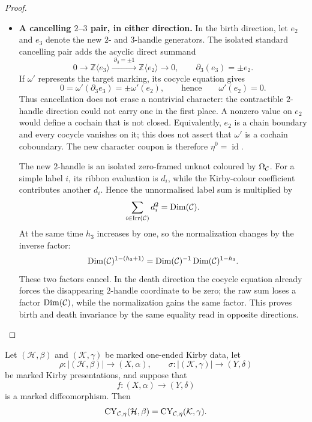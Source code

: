 \begin{proof}
\begin{itemize}
\begin{itemize}
  \item \textbf{A cancelling \(2\)--\(3\) pair, in either direction.}
  In the birth direction, let \(e_2\) and \(e_3\) denote the new
  \(2\)- and \(3\)-handle generators.  The isolated standard cancelling
  pair adds the acyclic direct summand
  \[
    0\longrightarrow \mathbb Z\langle e_3\rangle
      \xrightarrow{\;\partial_3=\pm1\;}
    \mathbb Z\langle e_2\rangle
      \longrightarrow0,
    \qquad
    \partial_3(e_3)=\pm e_2.
  \]
  If \(\omega'\) represents the target marking, its cocycle equation gives
  \[
    0=\omega'(\partial_3e_3)=\pm\omega'(e_2),
    \qquad\text{hence}\qquad
    \omega'(e_2)=0.
  \]
  Thus cancellation does not erase a nontrivial character: the contractible
  \(2\)-handle direction could not carry one in the first place.  A nonzero
  value on \(e_2\) would define a cochain that is not closed.  Equivalently,
  \(e_2\) is a chain boundary and every cocycle vanishes on it; this does not
  assert that \(\omega'\) is a cochain coboundary.  The new character coupon
  is therefore \(\eta^0=\operatorname{id}\).

  The new \(2\)-handle is an isolated zero-framed unknot coloured by
  \(\Omega_{\mathcal{C}}\).  For a simple label \(i\), its ribbon evaluation is
  \(d_i\), while the Kirby-colour coefficient contributes another \(d_i\).
  Hence the unnormalised label sum is multiplied by
  \[
    \sum_{i\in\operatorname{Irr}(\mathcal{C})}d_i^2
    =\operatorname{Dim}(\mathcal{C}).
  \]
  At the same time \(h_3\) increases by one, so the normalization changes by
  the inverse factor:
  \[
    \operatorname{Dim}(\mathcal{C})^{1-(h_3+1)}
    =\operatorname{Dim}(\mathcal{C})^{-1}
      \operatorname{Dim}(\mathcal{C})^{1-h_3}.
  \]
  These two factors cancel.  In the death direction the cocycle equation
  already forces the disappearing \(2\)-handle coordinate to be zero; the
  raw sum loses a factor \(\operatorname{Dim}(\mathcal{C})\), while the normalization
  gains the same factor.  This proves birth and death invariance by the same
  equality read in opposite directions.
\end{itemize}
\end{itemize}

\end{proof}

\begin{theorem}
\label{thm:marked-kirby-invariance-descent}
Let \((\mathcal H,\beta)\) and \((\mathcal K,\gamma)\) be marked one-ended
Kirby data, let
\[
  \rho\colon|(\mathcal H,\beta)|\longrightarrow(X,\alpha),
  \qquad
  \sigma\colon|(\mathcal K,\gamma)|\longrightarrow(Y,\delta)
\]
be marked Kirby presentations, and suppose that
\[
  f\colon(X,\alpha)\longrightarrow(Y,\delta)
\]
is a marked diffeomorphism.  Then
\[
  \operatorname{CY}_{\mathcal{C},\eta}(\mathcal H,\beta)
  =\operatorname{CY}_{\mathcal{C},\eta}(\mathcal K,\gamma).
\]
\end{theorem}

